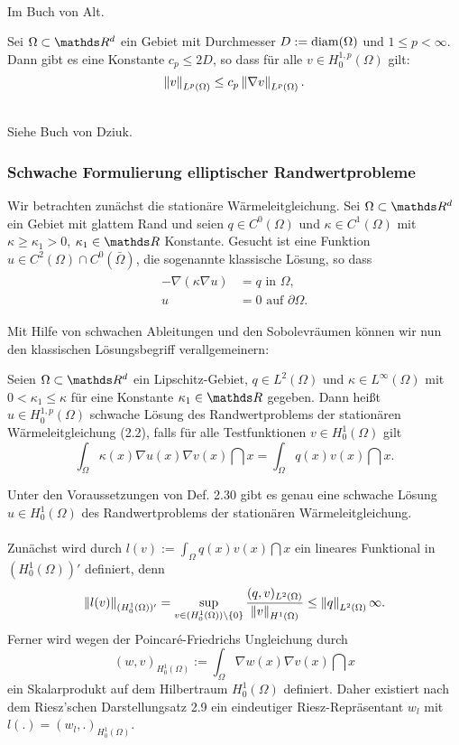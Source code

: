 \\
Im Buch von Alt.

Sei $\Omega\subset \R^d$ ein Gebiet mit Durchmesser $D:=\operatorname{diam}(\Omega)$ und $1\le p <\infty$.
Dann gibt es eine Konstante $c_p\le 2D$, so dass für alle $v\in H_0^{1,p}(\Omega)$ gilt:
\[
\left\Vert v\right\Vert_{L^p(\Omega)}  \le c_p \left\Vert\nabla v\right\Vert_{L^p(\Omega)}.
\]

\\
Siehe Buch von Dziuk.

\subsubsection{Schwache Formulierung elliptischer Randwertprobleme}
Wir betrachten zunächst die stationäre Wärmeleitgleichung.
Sei $\Omega\subset \R^d$ ein Gebiet mit glattem Rand und seien $q\in C^0(\Omega)$ und $\kappa\in C^1(\Omega)$ mit $\kappa\ge \kappa_1>0$, $\kappa_1\in \R$ Konstante.
Gesucht ist eine Funktion $u\in C^2(\Omega)\cap C^0(\bar{\Omega})$, die sogenannte klassische Lösung, so dass
\begin{align}
\begin{split}
-\nabla (\kappa \nabla u) &= q \text{ in } \Omega,\\
u &= 0 \text{ auf } \partial\Omega. 
\end{split}
\end{align}

Mit Hilfe von schwachen Ableitungen und den Sobolevräumen können wir nun den klassischen Lösungsbegriff verallgemeinern:

Seien $\Omega\subset \R^d$ ein Lipschitz-Gebiet, $q\in L^2(\Omega)$ und $\kappa \in L^\infty(\Omega)$ mit $0< \kappa_1 \le \kappa$ für eine Konstante $\kappa_1\in \R$ gegeben.
Dann heißt $u\in H_0^{1,p}(\Omega)$ schwache Lösung des Randwertproblems der stationären Wärmeleitgleichung (2.2), falls für alle Testfunktionen $v\in H_0^{1}(\Omega)$ gilt 
\[
\int_{\Omega} \kappa(x) \nabla u(x) \nabla v(x) \dint x = \int_{\Omega} q(x) v(x) \dint x.
\]

Unter den Voraussetzungen von Def. 2.30 gibt es genau eine schwache Lösung $u\in H_0^{1}(\Omega)$ des Randwertproblems der stationären Wärmeleitgleichung.\\

\\
Zunächst wird durch $l(v) := \int_{\Omega} q(x) v(x) \dint x$ ein lineares Funktional in $(H_0^{1}(\Omega))'$ definiert, denn
\[
\left\Vert l(v)\right\Vert_{(H_0^1(\Omega))'} = \sup\limits_{v\in (H_0^1(\Omega))\backslash \{0\}} \frac{(q,v)_{L^2(\Omega)}}{\left\Vert v\right\Vert_{H^1(\Omega)}} \le \left\Vert q\right\Vert_{L^2(\Omega)}  \infty.
\]
Ferner wird wegen der Poincaré-Friedrichs Ungleichung durch
\[
(w,v)_{H_0^1(\Omega)} := \int_{\Omega} \nabla w(x) \nabla v(x)\dint x
\]
ein Skalarprodukt auf dem Hilbertraum $H_0^1(\Omega)$ definiert.
Daher existiert nach dem Riesz'schen Darstellungsatz 2.9 ein eindeutiger Riesz-Repräsentant $w_l$ mit $l(.) = (w_l,.)_{H_0^1(\Omega)}$.

